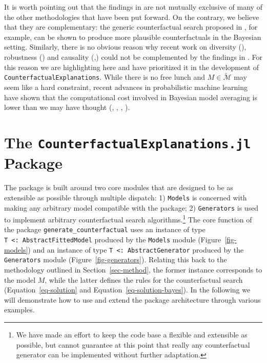 \documentclass{juliacon}
\begin{document}
It is worth pointing out that the findings in \cite{schut2021generating}
are not mutually exclusive of many of the other methodologies that have
been put forward. On the contrary, we believe that they are
complementary: the generic counterfactual search proposed in
\cite{wachter2017counterfactual}, for example, can be shown to produce
more plausible counterfactuals in the Bayesian setting. Similarly, there
is no obvious reason why recent work on diversity
(\cite{mothilal2020explaining}), robustness (\cite{upadhyay2021towards})
and causality
(\cite{karimi2020algorithmic},\cite{karimi2021algorithmic}) could not be
complemented by the findings in \cite{schut2021generating}. For this
reason we are highlighting \cite{schut2021generating} here and have
prioritized it in the development of
\texttt{CounterfactualExplanations}. While there is no free lunch and
\(M\in\mathcal{\widetilde{M}}\) may seem like a hard constraint, recent
advances in probabilistic machine learning have shown that the
computational cost involved in Bayesian model averaging is lower than we
may have thought (\cite{gal2016dropout},
\cite{lakshminarayanan2016simple}, \cite{daxberger2021laplace},
\cite{murphy2022probabilistic}).

\hypertarget{sec-use}{%
\section{\texorpdfstring{The \texttt{CounterfactualExplanations.jl}
Package}{The CounterfactualExplanations.jl Package}}\label{sec-use}}

The package is built around two core modules that are designed to be as
extensible as possible through multiple dispatch: 1) \texttt{Models} is
concerned with making any arbitrary model compatible with the package;
2) \texttt{Generators} is used to implement arbitrary counterfactual
search algorithms.\footnote{We have made an effort to keep the code base
  a flexible and extensible as possible, but cannot guarantee at this
  point that really any counterfactual generator can be implemented
  without further adaptation.} The core function of the package
\texttt{generate\_counterfactual} uses an instance of type
\texttt{T\ \textless{}:\ AbstractFittedModel} produced by the
\texttt{Models} module (Figure~\ref{fig-models}) and an instance of type
\texttt{T\ \textless{}:\ AbstractGenerator} produced by the
\texttt{Generators} module (Figure~\ref{fig-generators}). Relating this
back to the methodology outlined in Section~\ref{sec-method}, the former
instance corresponds to the model \(M\), while the latter defines the
rules for the counterfactual search (Equation~\ref{eq-solution} and
Equation~\ref{eq-solution-bayes}). In the following we will demonstrate
how to use and extend the package architecture through various examples.
\end{document}
